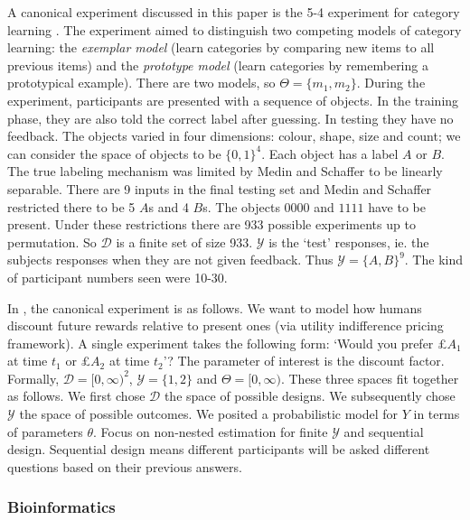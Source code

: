 A canonical experiment discussed in this paper is the 5-4 experiment for category learning \cite{medin1978}. The experiment aimed to distinguish two competing models of category learning: the \textit{exemplar model} (learn categories by comparing new items to all previous items) and the \textit{prototype model} (learn categories by remembering a prototypical example). There are two models, so $\Theta = \{m_1, m_2\}$. During the experiment, participants are presented with a sequence of objects. In the training phase, they are also told the correct label after guessing. In testing they have no feedback. The objects varied in four dimensions: colour, shape, size and count; we can consider the space of objects to be $\{0,1\}^4$. Each object has a label $A$ or $B$. The true labeling mechanism was limited by Medin and Schaffer to be linearly separable. There are 9 inputs in the final testing set and Medin and Schaffer restricted there to be 5 $A$s and 4 $B$s. The objects $0000$ and $1111$ have to be present. Under these restrictions there are 933 possible experiments up to permutation. So $\mathcal{D}$ is a finite set of size 933. $\mathcal{Y}$ is the `test' responses, ie. the subjects responses when they are not given feedback. Thus $\mathcal{Y} = \{A, B\}^9$. The kind of participant numbers seen were 10-30.

In \cite{vincent2017}, the canonical experiment is as follows. We want to model how humans discount future rewards relative to present ones (via utility indifference pricing framework). A single experiment takes the following form: `Would you prefer £$A_1$ at time $t_1$ or £$A_2$ at time $t_2$'? The parameter of interest is the discount factor. Formally, $\mathcal{D} = [0, \infty)^2$, $\mathcal{Y} = \{1, 2\}$ and $\Theta = [0, \infty)$. These three spaces fit together as follows. We first chose $\mathcal{D}$ the space of possible designs. We subsequently chose $\mathcal{Y}$ the space of possible outcomes. We posited a probabilistic model for $Y$ in terms of parameters $\theta$. Focus on non-nested estimation for finite $\mathcal{Y}$ and sequential design. Sequential design means different participants will be asked different questions based on their previous answers.

\subsubsection{Bioinformatics}

